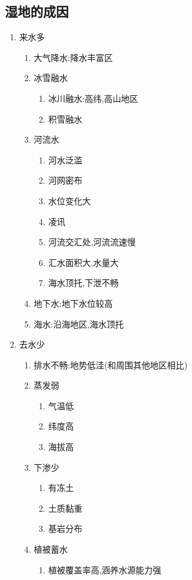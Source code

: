 \documentclass[a4paper]{article}
\begin{document}
    \subsection{湿地的成因}
    \begin{enumerate}
        \item 来水多
        \begin{enumerate}
            \item 大气降水:降水丰富区
            \item 冰雪融水
            \begin{enumerate}
                \item 冰川融水:高纬,高山地区
                \item 积雪融水
            \end{enumerate}
            \item 河流水
            \begin{enumerate}
                \item 河水泛滥
                    \item 河网密布
                    \item 水位变化大
                    \item 凌讯
                    \item 河流交汇处,河流流速慢
                    \item 汇水面积大,水量大
                    \item 海水顶托,下泄不畅
            \end{enumerate}
            \item 地下水:地下水位较高
            \item 海水:沿海地区,海水顶托
        \end{enumerate}
        \item 去水少
        \begin{enumerate}
            \item 排水不畅:地势低洼(和周围其他地区相比)
            \item 蒸发弱
            \begin{enumerate}
                \item 气温低
                    \item 纬度高
                    \item 海拔高
            \end{enumerate}
            \item 下渗少
            \begin{enumerate}
                \item 有冻土
                \item 土质黏重
                \item 基岩分布
            \end{enumerate}
            \item 植被蓄水
            \begin{enumerate}
                \item 植被覆盖率高,涵养水源能力强
            \end{enumerate}
        \end{enumerate}
    \end{enumerate}
\end{document}
